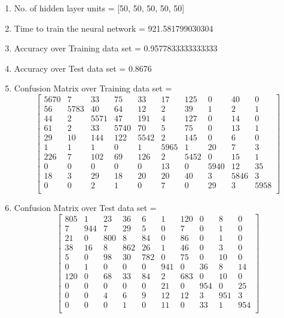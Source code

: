 \documentclass[11pt]{article}
\begin{document}
\hline
\begin{enumerate}
\item No. of hidden layer units = [50, 50, 50, 50, 50]
\item Time to train the neural network = 921.581799030304
\item Accuracy over Training data set = 0.9577833333333333
\item Accuracy over Test data set = 0.8676
\item Confusion Matrix over Training data set = 
\begin{equation}
  \begin{bmatrix}
5670 & 7 & 33 & 75 & 33 & 17 & 125 & 0 & 40 & 0\\
56 & 5783 & 40 & 64 & 12 & 2 & 39 & 1 & 2 & 1\\
44 & 2 & 5571 & 47 & 191 & 4 & 127 & 0 & 14 & 0\\
61 & 2 & 33 & 5740 & 70 & 5 & 75 & 0 & 13 & 1\\
29 & 10 & 144 & 122 & 5542 & 2 & 145 & 0 & 6 & 0\\
1 & 1 & 1 & 0 & 1 & 5965 & 1 & 20 & 7 & 3\\
226 & 7 & 102 & 69 & 126 & 2 & 5452 & 0 & 15 & 1\\
0 & 0 & 0 & 0 & 0 & 13 & 0 & 5940 & 12 & 35\\
18 & 3 & 29 & 18 & 20 & 20 & 40 & 3 & 5846 & 3\\
0 & 0 & 2 & 1 & 0 & 7 & 0 & 29 & 3 & 5958\\
  \end{bmatrix}
\end{equation}
\item Confusion Matrix over Test data set = 
\begin{equation}
  \begin{bmatrix}
805 & 1 & 23 & 36 & 6 & 1 & 120 & 0 & 8 & 0\\
7 & 944 & 7 & 29 & 5 & 0 & 7 & 0 & 1 & 0\\
21 & 0 & 800 & 8 & 84 & 0 & 86 & 0 & 1 & 0\\
38 & 16 & 8 & 862 & 26 & 1 & 46 & 0 & 3 & 0\\
5 & 0 & 98 & 30 & 782 & 0 & 75 & 0 & 10 & 0\\
0 & 1 & 0 & 0 & 0 & 941 & 0 & 36 & 8 & 14\\
120 & 0 & 68 & 33 & 84 & 2 & 683 & 0 & 10 & 0\\
0 & 0 & 0 & 0 & 0 & 21 & 0 & 954 & 0 & 25\\
0 & 0 & 4 & 6 & 9 & 12 & 12 & 3 & 951 & 3\\
0 & 0 & 0 & 1 & 0 & 11 & 0 & 33 & 1 & 954\\
  \end{bmatrix}
\end{equation}
\end{enumerate}
\end{document}
